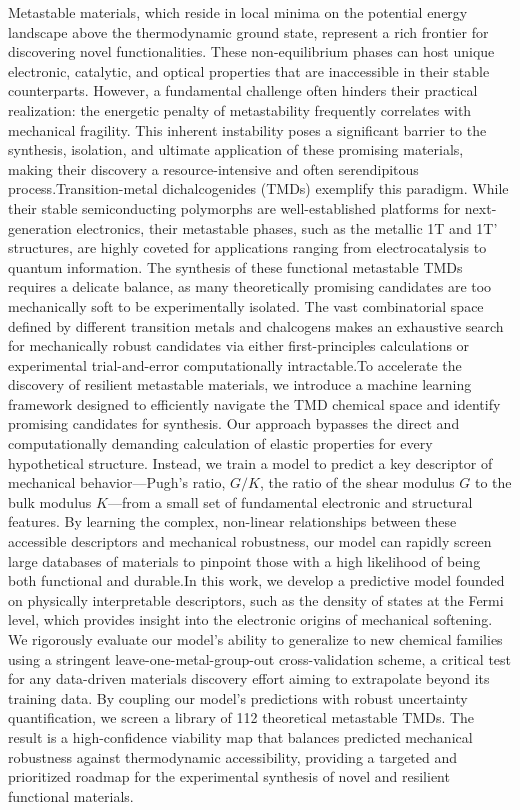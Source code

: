 \documentclass[]{article}
\begin{document}
Metastable materials, which reside in local minima on the potential energy landscape above the thermodynamic ground state, represent a rich frontier for discovering novel functionalities. These non-equilibrium phases can host unique electronic, catalytic, and optical properties that are inaccessible in their stable counterparts. However, a fundamental challenge often hinders their practical realization: the energetic penalty of metastability frequently correlates with mechanical fragility. This inherent instability poses a significant barrier to the synthesis, isolation, and ultimate application of these promising materials, making their discovery a resource-intensive and often serendipitous process.Transition-metal dichalcogenides (TMDs) exemplify this paradigm. While their stable semiconducting polymorphs are well-established platforms for next-generation electronics, their metastable phases, such as the metallic 1T and 1T' structures, are highly coveted for applications ranging from electrocatalysis to quantum information. The synthesis of these functional metastable TMDs requires a delicate balance, as many theoretically promising candidates are too mechanically soft to be experimentally isolated. The vast combinatorial space defined by different transition metals and chalcogens makes an exhaustive search for mechanically robust candidates via either first-principles calculations or experimental trial-and-error computationally intractable.To accelerate the discovery of resilient metastable materials, we introduce a machine learning framework designed to efficiently navigate the TMD chemical space and identify promising candidates for synthesis. Our approach bypasses the direct and computationally demanding calculation of elastic properties for every hypothetical structure. Instead, we train a model to predict a key descriptor of mechanical behavior—Pugh's ratio, $G/K$, the ratio of the shear modulus $G$ to the bulk modulus $K$—from a small set of fundamental electronic and structural features. By learning the complex, non-linear relationships between these accessible descriptors and mechanical robustness, our model can rapidly screen large databases of materials to pinpoint those with a high likelihood of being both functional and durable.In this work, we develop a predictive model founded on physically interpretable descriptors, such as the density of states at the Fermi level, which provides insight into the electronic origins of mechanical softening. We rigorously evaluate our model's ability to generalize to new chemical families using a stringent leave-one-metal-group-out cross-validation scheme, a critical test for any data-driven materials discovery effort aiming to extrapolate beyond its training data. By coupling our model's predictions with robust uncertainty quantification, we screen a library of 112 theoretical metastable TMDs. The result is a high-confidence viability map that balances predicted mechanical robustness against thermodynamic accessibility, providing a targeted and prioritized roadmap for the experimental synthesis of novel and resilient functional materials.
\end{document}
